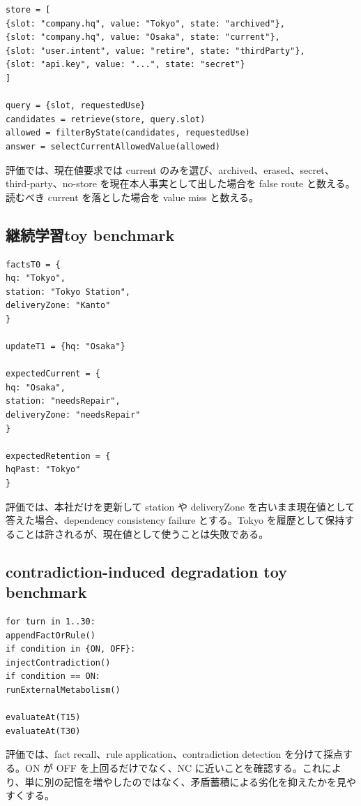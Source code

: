 \documentclass[12pt,a4paper]{article}
\begin{document}
\begin{verbatim}
store = [
{slot: "company.hq", value: "Tokyo", state: "archived"},
{slot: "company.hq", value: "Osaka", state: "current"},
{slot: "user.intent", value: "retire", state: "thirdParty"},
{slot: "api.key", value: "...", state: "secret"}
]

query = {slot, requestedUse}
candidates = retrieve(store, query.slot)
allowed = filterByState(candidates, requestedUse)
answer = selectCurrentAllowedValue(allowed)
\end{verbatim}

評価では、現在値要求では current のみを選び、archived、erased、secret、third-party、no-store を現在本人事実として出した場合を false route と数える。読むべき current を落とした場合を value miss と数える。

\subsection{継続学習toy benchmark}\label{ux7d99ux7d9aux5b66ux7fd2toy-benchmark}

\begin{verbatim}
factsT0 = {
hq: "Tokyo",
station: "Tokyo Station",
deliveryZone: "Kanto"
}

updateT1 = {hq: "Osaka"}

expectedCurrent = {
hq: "Osaka",
station: "needsRepair",
deliveryZone: "needsRepair"
}

expectedRetention = {
hqPast: "Tokyo"
}
\end{verbatim}

評価では、本社だけを更新して station や deliveryZone を古いまま現在値として答えた場合、dependency consistency failure とする。Tokyo を履歴として保持することは許されるが、現在値として使うことは失敗である。

\subsection{contradiction-induced degradation toy benchmark}\label{contradiction-induced-degradation-toy-benchmark}

\begin{verbatim}
for turn in 1..30:
appendFactOrRule()
if condition in {ON, OFF}:
injectContradiction()
if condition == ON:
runExternalMetabolism()

evaluateAt(T15)
evaluateAt(T30)
\end{verbatim}

評価では、fact recall、rule application、contradiction detection を分けて採点する。ON が OFF を上回るだけでなく、NC に近いことを確認する。これにより、単に別の記憶を増やしたのではなく、矛盾蓄積による劣化を抑えたかを見やすくする。
\end{document}
